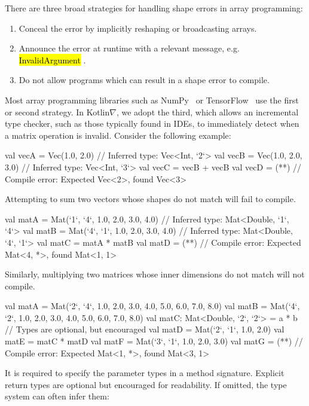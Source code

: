 \documentclass[12pt,initial,twoside,maitrise]{dms}
\makeatletter
\def\uwave{\bgroup \markoverwith{\lower3.5\p@\hbox{\sixly \textcolor{red}{\char58}}}\ULon}
\newcommand{\inline}[1]{%
\begingroup%
\sethlcolor{slightgray}%
\hl{\ttfamily\small #1}%
\endgroup
}
\numberwithin{equation}{section}
\numberwithin{table}{chapter}
\numberwithin{figure}{chapter}
\makeatother
\begin{document}
\noindent There are three broad strategies for handling shape errors in array programming: \\
%
\begin{enumerate}
    \item Conceal the error by implicitly reshaping or broadcasting arrays.
    \item Announce the error at runtime with a relevant message, e.g.~\inline{InvalidArgument}.
    \item Do not allow programs which can result in a shape error to compile. \\
\end{enumerate}
%
Most array programming libraries such as NumPy~\citep{van2011numpy} or TensorFlow~\citep{abadi2016tensorflow} use the first or second strategy. In Kotlin$\nabla$, we adopt the third, which allows an incremental type checker, such as those typically found in IDEs, to immediately detect when a matrix operation is invalid. Consider the following example:
%
\begin{kotlinlisting}
val vecA = Vec(1.0, 2.0)      // Inferred type: Vec<Int, `2`>
val vecB = Vec(1.0, 2.0, 3.0) // Inferred type: Vec<Int, `3`>
val vecC = vecB + vecB
val vecD = (*\uwave{vecA + vecB}*) // Compile error: Expected Vec<2>, found Vec<3>
\end{kotlinlisting}
%
Attempting to sum two vectors whose shapes do not match will fail to compile.
%
\begin{kotlinlisting}
val matA = Mat(`1`, `4`, 1.0, 2.0, 3.0, 4.0) // Inferred type: Mat<Double, `1`, `4`>
val matB = Mat(`4`, `1`, 1.0, 2.0, 3.0, 4.0) // Inferred type: Mat<Double, `4`, `1`>
val matC = matA * matB
val matD = (*\uwave{matA *\ matC}*) // Compile error: Expected Mat<4, *>, found Mat<1, 1>
\end{kotlinlisting}
%
Similarly, multiplying two matrices whose inner dimensions do not match will not compile.
%
\begin{kotlinlisting}
val matA = Mat(`2`, `4`,
               1.0, 2.0, 3.0, 4.0,
               5.0, 6.0, 7.0, 8.0)
val matB = Mat(`4`, `2`,
               1.0, 2.0,
               3.0, 4.0,
               5.0, 6.0,
               7.0, 8.0)
val matC: Mat<Double, `2`, `2`> = a * b // Types are optional, but encouraged
val matD = Mat(`2`, `1`, 1.0, 2.0)
val matE = matC * matD
val matF = Mat(`3`, `1`, 1.0, 2.0, 3.0)
val matG = (*\uwave{matE *\ matF}*) // Compile error: Expected Mat<1, *>, found Mat<3, 1>
\end{kotlinlisting}
%
It is required to specify the parameter types in a method signature. Explicit return types are optional but encouraged for readability. If omitted, the type system can often infer them:
\end{document}
